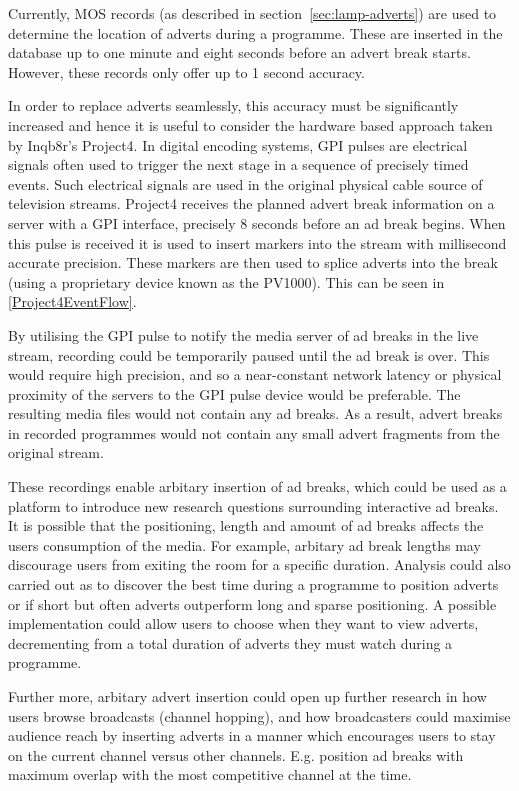 	Currently, MOS records (as described in section~\ref{sec:lamp-adverts}) are used to determine the location of adverts during a programme. These are inserted in the database up to one minute and eight seconds before an advert break starts. However, these records only offer up to 1 second accuracy. %

	In order to replace adverts seamlessly, this accuracy must be significantly increased and hence it is useful to consider the hardware based approach taken by Inqb8r's Project4. In digital encoding systems, GPI pulses are electrical signals often used to trigger the next stage in a sequence of precisely timed events. Such electrical signals are used in the original physical cable source of television streams. Project4 receives the planned advert break information on a server with a GPI interface, precisely 8 seconds before an ad break begins. When this pulse is received it is used to insert markers into the stream with millisecond accurate precision. These markers are then used to splice adverts into the break (using a proprietary device known as the PV1000). This can be seen in \ref{Project4EventFlow}.

	By utilising the GPI pulse to notify the media server of ad breaks in the live stream, recording could be temporarily paused until the ad break is over. This would require high precision, and so a near-constant network latency or physical proximity of the servers to the GPI pulse device would be preferable. The resulting media files would not contain any ad breaks. As a result, advert breaks in recorded programmes would not contain any small advert fragments from the original stream.

	These recordings enable arbitary insertion of ad breaks, which could be used as a platform to introduce new research questions surrounding interactive ad breaks. It is possible that the positioning, length and amount of ad breaks affects the users consumption of the media. For example, arbitary ad break lengths may discourage users from exiting the room for a specific duration. Analysis could also carried out as to discover the best time during a programme to position adverts or if short but often adverts outperform long and sparse positioning. A possible implementation could allow users to choose when they want to view adverts, decrementing from a total duration of adverts they must watch during a programme.

	Further more, arbitary advert insertion could open up further research in how users browse broadcasts (channel hopping), and how broadcasters could maximise audience reach by inserting adverts in a manner which encourages users to stay on the current channel versus other channels. E.g. position ad breaks with maximum overlap with the most competitive channel at the time.
	
